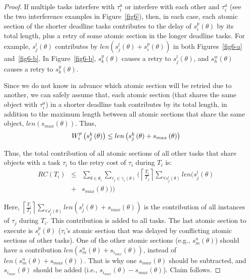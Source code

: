 \documentclass[letter]{sig-alternate}
\begin{document}
\begin{proof}
If multiple tasks interfere with $\tau_{i}^a$ or
interfere with each other and $\tau_{i}^a$ (see the two interference examples in Figure~\ref{fig6}), then, in each case, each atomic section of the shorter deadline tasks contributes to the delay of $s_{i}^{p}(\theta)$ by its total length, plus a retry of some atomic section in the longer deadline tasks. For example,
$s_{j}^{l}(\theta)$ contributes by $len(s_{j}^{l}(\theta)+s_{i}^{p}(\theta))$
in both Figures~\ref{fig6-a} and~\ref{fig6-b}. 
In Figure~\ref{fig6-b}, $s_{k}^{y}(\theta)$ causes a retry 
to $s_{j}^{l}(\theta)$, and $s_{h}^{w}(\theta)$ causes a retry to $s_{k}^{y}(\theta)$.


Since we do not know in advance which atomic section will be retried
due to another, we can safely assume that, each atomic section (that shares the same object with  $\tau_i^a$) in a shorter deadline task contributes by its total length, in addition to the maximum length between all atomic sections that share the same object, $len(s_{max}(\theta))$. Thus, 
\begin{equation}
\mbox{\ensuremath{W_{i}^{p}\left(s_{j}^{k}\left(\theta\right)\right)\le len\left(s_{j}^{k}\left(\theta\right)+s_{max}\left(\theta\right)\right)}}\label{eq2}\end{equation}


Thus, the total contribution of all atomic sections of all other tasks
that share objects with a task $\tau_i$ 
to the retry cost of $\tau_i$ during $T_i$ is:
\begin{eqnarray}
RC\left(T_{i}\right) & \le & \sum_{\theta\in\theta_{i}}\sum_{\tau_{j}\in\gamma_i(\theta)}\Big(\left\lceil\frac{T_{i}}{T_{j}}\right\rceil\sum_{\forall s_{j}^{l}(\theta)}len\big(s_{j}^{l}(\theta)\nonumber \\
 & + & s_{max}(\theta)\big)\Big)\label{eq3-1}\end{eqnarray}



Here, $\left\lceil\frac{T_{i}}{T_{j}}\right\rceil\sum_{\forall s_{j}^{l}\left(\theta\right)}len\left(s_{j}^{l}\left(\theta\right)+s_{max}\left(\theta\right)\right)$ is  the contribution of all instances of $\tau_{j}$ during $T_{i}$. This contribution is added to all tasks. The last atomic section to execute is $s_{i}^{p}(\theta)$ ($\tau_i$'s atomic section that was delayed by conflicting atomic sections of other tasks). One of the other atomic sections (e.g., $s_{m}^{n}(\theta)$) should have a contribution $len(s_{m}^{n}(\theta)+s_{i_{max}}(\theta))$, instead of $len(s_{m}^{n}(\theta)+s_{max}(\theta))$. That is why one $s_{max}(\theta)$ should be subtracted, and $s_{i_{max}}(\theta)$ should be added (i.e., $s_{i_{max}}(\theta)-s_{max}(\theta)$). Claim follows.
\end{proof}
\end{document}
